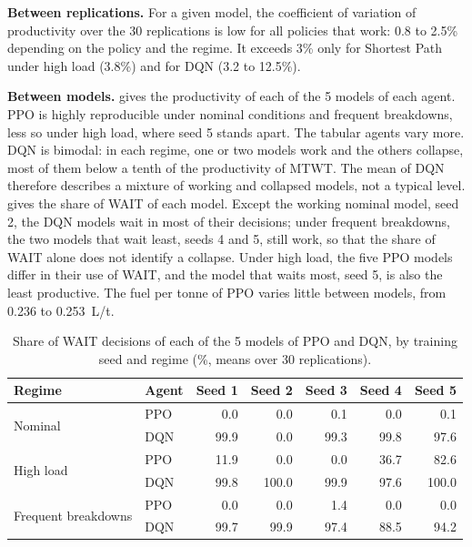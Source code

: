 \documentclass[11pt,a4paper]{article}
\newif\ifrevmarks
\newcommand{\revtag}[1]{\ifrevmarks\textsuperscript{\textcolor{red!70!black}{\scriptsize[#1]}}\fi}
\newenvironment{revbloc}[1]{\par\ifrevmarks\color{revcolor}\noindent\revtag{#1}\ \fi}{\par}
\newif\ifcorrmarks
\newcommand{\corr}[1]{\ifcorrmarks\textcolor{corrcolor}{#1}\else#1\fi}
\newenvironment{corrbloc}{\par\ifcorrmarks\color{corrcolor}\fi}{\par}
\begin{document}
\begin{revbloc}{T31}
\textbf{Between replications.} For a given model, the coefficient of variation of productivity over the 30 replications is low for all policies that work: 0.8 to 2.5\% depending on the policy and the regime. It exceeds 3\% only for Shortest Path under high load (3.8\%) and for DQN (3.2 to 12.5\%).

\textbf{Between models.}  gives the productivity of each of the 5 models of each agent. PPO is highly reproducible \corr{under nominal conditions and frequent breakdowns, less so under high load, where seed 5 stands apart}. The tabular agents vary more. DQN is bimodal: in each regime, \corr{one or two models work and the others collapse, most of them below a tenth of the productivity of MTWT}. The mean of DQN therefore describes a mixture of working and collapsed models, not a typical level. \corr{ gives the share of WAIT of each model. Except the working nominal model, seed 2, the DQN models wait in most of their decisions; under frequent breakdowns, the two models that wait least, seeds 4 and 5, still work, so that the share of WAIT alone does not identify a collapse. Under high load, the five PPO models differ in their use of WAIT, and the model that waits most, seed 5, is also the least productive. The fuel per tonne of PPO varies little between models, from 0.236 to 0.253~L/t.}

\begin{corrbloc}
\begin{table}[H]
\centering
\caption{Share of WAIT decisions of each of the 5 models of PPO and DQN, by training seed and regime (\%, means over 30 replications).}
\label{tab:runs_wait}
\small
\setlength{\tabcolsep}{4pt}
\begin{tabular}{@{}llrrrrr@{}}
\toprule
\textbf{Regime} & \textbf{Agent} & \textbf{Seed 1} & \textbf{Seed 2} & \textbf{Seed 3} & \textbf{Seed 4} & \textbf{Seed 5} \\
\midrule
\multirow{2}{*}{Nominal} & PPO & 0.0 & 0.0 & 0.1 & 0.0 & 0.1 \\
 & DQN & 99.9 & 0.0 & 99.3 & 99.8 & 97.6 \\
\midrule
\multirow{2}{*}{High load} & PPO & 11.9 & 0.0 & 0.0 & 36.7 & 82.6 \\
 & DQN & 99.8 & 100.0 & 99.9 & 97.6 & 100.0 \\
\midrule
\multirow{2}{*}{Frequent breakdowns} & PPO & 0.0 & 0.0 & 1.4 & 0.0 & 0.0 \\
 & DQN & 99.7 & 99.9 & 97.4 & 88.5 & 94.2 \\
\bottomrule
\end{tabular}
\end{table}
\end{corrbloc}


\end{revbloc}
\end{document}
